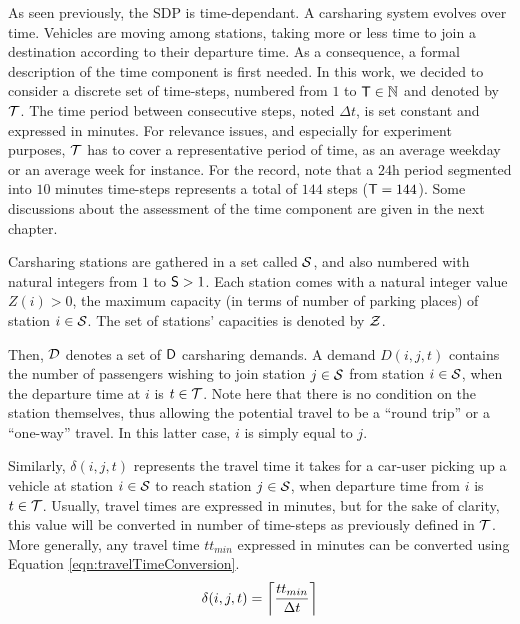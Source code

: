 \begin{bibunit}[ieeetr]
As seen previously, the SDP is time-dependant.
A carsharing system evolves over time.
Vehicles are moving among stations, taking more or less time to join a destination according to their departure time.
As a consequence, a formal description of the time component is first needed.
In this work, we decided to consider a discrete set of time-steps, numbered from $1$ to $\nbTimeSteps \in \N$ and denoted by $\timeStepSet$.
The time period between consecutive steps, noted $\Delta t$, is set constant and expressed in minutes.
For relevance issues, and especially for experiment purposes, $\timeStepSet$ has to cover a representative period of time, as an average weekday or an average week for instance.
For the record, note that a $24$h period segmented into $10$ minutes time-steps represents a total of $144$ steps (\ie $\nbTimeSteps = 144$).
Some discussions about the assessment of the time component are given in the next chapter.
\medskip

Carsharing stations are gathered in a set called $\stationSet$, and also numbered with natural integers from $1$ to $\nbStations > 1$.
Each station comes with a natural integer value $Z(i) > 0$, the maximum capacity (in terms of number of parking places) of station $i \in \stationSet$.
The set of stations' capacities is denoted by $\sCapaSet$.
\medskip

Then, $\demandSet$ denotes a set of $\nbDemands$ carsharing demands.
A demand $D(i,j,t)$ contains the number of passengers wishing to join station $j \in \stationSet$ from station $i \in \stationSet$, when the departure time at $i$ is $t \in \timeStepSet$.
Note here that there is no condition on the station themselves, thus allowing the potential travel to be a ``round trip'' or a ``one-way'' travel.
In this latter case, $i$ is simply equal to $j$.
\medskip

Similarly, $\delta(i,j,t)$ represents the travel time it takes for a car-user picking up a vehicle at station $i \in \stationSet$ to reach station $j \in \stationSet$, when departure time from $i$ is $t \in \timeStepSet$.
Usually, travel times are expressed in minutes, but for the sake of clarity, this value will be converted in number of time-steps as previously defined in $\timeStepSet$.
More generally, any travel time $tt_{min}$ expressed in minutes can be converted using Equation \ref{eqn:travelTimeConversion}.
\begin{equation}\label{eqn:travelTimeConversion}
\delta(i,j,t) = \ceil*{\frac{tt_{min}}{\Delta t}}
\end{equation}


\end{bibunit}
